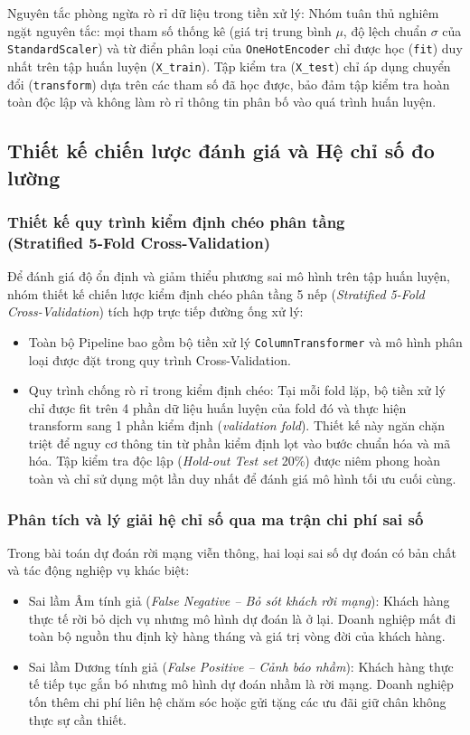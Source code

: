 \documentclass[a4paper]{article}
\begin{document}
{Nguyên tắc phòng ngừa rò rỉ dữ liệu trong tiền xử lý: Nhóm tuân thủ nghiêm ngặt nguyên tắc: mọi tham số thống kê (giá trị trung bình $\mu$, độ lệch chuẩn $\sigma$ của \texttt{StandardScaler}) và từ điển phân loại của \texttt{OneHotEncoder} chỉ được học (\texttt{fit}) duy nhất trên tập huấn luyện (\texttt{X\_train}). Tập kiểm tra (\texttt{X\_test}) chỉ áp dụng chuyển đổi (\texttt{transform}) dựa trên các tham số đã học được, bảo đảm tập kiểm tra hoàn toàn độc lập và không làm rò rỉ thông tin phân bố vào quá trình huấn luyện.

\subsection{Thiết kế chiến lược đánh giá và Hệ chỉ số đo lường}

\subsubsection{Thiết kế quy trình kiểm định chéo phân tầng\\(Stratified 5-Fold Cross-Validation)}
Để đánh giá độ ổn định và giảm thiểu phương sai mô hình trên tập huấn luyện, nhóm thiết kế chiến lược kiểm định chéo phân tầng 5 nếp (\textit{Stratified 5-Fold Cross-Validation}) tích hợp trực tiếp đường ống xử lý:
\begin{itemize}[nosep, topsep=2pt, itemsep=2pt]
    \item Toàn bộ Pipeline bao gồm bộ tiền xử lý \texttt{ColumnTransformer} và mô hình phân loại được đặt trong quy trình Cross-Validation.
    \item Quy trình chống rò rỉ trong kiểm định chéo: Tại mỗi fold lặp, bộ tiền xử lý chỉ được fit trên 4 phần dữ liệu huấn luyện của fold đó và thực hiện transform sang 1 phần kiểm định (\textit{validation fold}). Thiết kế này ngăn chặn triệt để nguy cơ thông tin từ phần kiểm định lọt vào bước chuẩn hóa và mã hóa. Tập kiểm tra độc lập (\textit{Hold-out Test set} 20\%) được niêm phong hoàn toàn và chỉ sử dụng một lần duy nhất để đánh giá mô hình tối ưu cuối cùng.
\end{itemize}

\subsubsection{Phân tích và lý giải hệ chỉ số qua ma trận chi phí sai số}
Trong bài toán dự đoán rời mạng viễn thông, hai loại sai số dự đoán có bản chất và tác động nghiệp vụ khác biệt:
\begin{itemize}[nosep, topsep=2pt, itemsep=2pt]
    \item Sai lầm Âm tính giả (\textit{False Negative -- Bỏ sót khách rời mạng}): Khách hàng thực tế rời bỏ dịch vụ nhưng mô hình dự đoán là ở lại. Doanh nghiệp mất đi toàn bộ nguồn thu định kỳ hàng tháng và giá trị vòng đời của khách hàng.
    \item Sai lầm Dương tính giả (\textit{False Positive -- Cảnh báo nhầm}): Khách hàng thực tế tiếp tục gắn bó nhưng mô hình dự đoán nhầm là rời mạng. Doanh nghiệp tốn thêm chi phí liên hệ chăm sóc hoặc gửi tặng các ưu đãi giữ chân không thực sự cần thiết.
\end{itemize}

}
\end{document}
